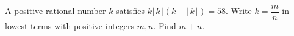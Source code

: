 A positive rational number $k$ satisfies $k\lfloor k\rfloor(k-\lfloor k\rfloor)=58$. Write $k=\dfrac{m}{n}$ in lowest terms with positive integers $m,n$. Find $m+n$.
